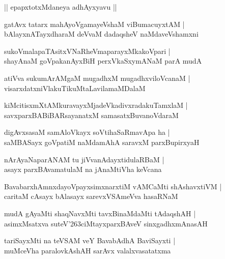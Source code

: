 \documentclass[twoside,12pt,openright]{book}
\def\S{\char'263}
\newcounter{shloka}[chapter]
\begin{document}
\begin{center}
|| epapxtotxMdaneya adhAyxyavu ||
\end{center}

\begin{shloka}%
gatAvx tatarx mahAyoVgamayeVshaM viBumacuyxtAM |\\
bAlayxnATayxdharaM deVvaM dadaqsheV naMdaveVshamxni
\end{shloka}

\begin{shloka}%
sukoVmalapaTAsitxVNaRheVmaparayxMkakoVpari |\\
shayAnaM goVpakanAyxBiH perxVkaSxymANaM parA mudA 
\end{shloka}

\begin{shloka}%
atiVva sukumArAMgaM mugadhxM mugadhxviloVcanaM |\\
visarxdatxniVlakuTikuMtaLavilamaMDalaM 
\end{shloka}

\begin{shloka}%
kiMcitisxmXtAMkuravayxMjadeVkadivxradakuTamxlaM |\\
savxparxBABiBARsayanatxM samasatxBuvanoVdaraM 
\end{shloka}

\begin{shloka}%
digAvxsasaM samAloVkayx soVtihaSaRmavApa ha |\\
saMBASayx goVpatiM naMdamAhA saravxM parxBupirxyaH 
\end{shloka}

\begin{shloka}%
nArAyaNaparANAM tu jiVvanAdayxtidulaRBaM |\\
asayx parxBAvamatulaM na jAnaMtiVha keVcana
\end{shloka}

\begin{shloka}%
BavabarxhAmnxdayoVpayxsimxnarxtiM vAMCaMti shAshavxtiVM |\\
caritaM cAsayx bAlasayx sarevxVSAmeVva hasaRNaM 
\end{shloka}

\begin{shloka}%
mudA gAyaMti shaqNavxMti tavxBinaMdaMti tAdaqshAH |\\
asimxMsatxva suteV\S ciMtayxparxBAveV sinxgadhxmAnasAH  
\end{shloka}

\begin{shloka}%
tariSayxMti na teVSAM veY BavabAdhA BaviSayxti |\\
muMceVha paralovkAshAH sarAvx valalxvasatatxma 
\end{shloka}
\end{document}
